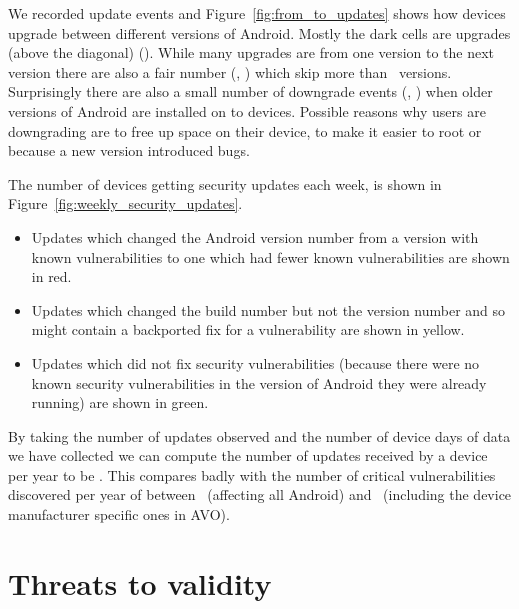\documentclass[conference,a4paper,twoside]{IEEEtran}
\newcommand{\avo}{AVO}
\begin{document}
We recorded update events and Figure~\ref{fig:from_to_updates} shows how devices upgrade between different versions of Android.
Mostly the dark cells are upgrades (above the diagonal) (\daNumUpdatesUpgrades).
While many upgrades are from one version to the next version there are also a fair number (\daNumUpdatesBigUpgrades, \daPercBigUpgrades) which skip more than \daNumUpdatesSkippedBig\ versions.
Surprisingly there are also a small number of downgrade events (\daNumUpdatesDowngrades, \daPercUpdatesDowngrades) when older versions of Android are installed on to devices.
Possible reasons why users are downgrading are to free up space on their device, to make it easier to root or because a new version introduced bugs.

The number of devices getting security updates each week, is shown in Figure~\ref{fig:weekly_security_updates}.
\begin{itemize}
 \item Updates which changed the Android version number from a version with known vulnerabilities to one which had fewer known vulnerabilities are shown in red.
 \item Updates which changed the build number but not the version number and so might contain a backported fix for a vulnerability are shown in yellow.
\item Updates which did not fix security vulnerabilities (because there were no known security vulnerabilities in the version of Android they were already running) are shown in green.

\end{itemize}

By taking the number of updates observed and the number of device days of data we have collected we can compute the number of updates received by a device per year to be \daUpdatesPerYear.
This compares badly with the number of critical vulnerabilities discovered per year of between \avoVulnsPerYearAllAndroid\ (affecting all Android) and \avoVulnsPerYear\ (including the device manufacturer specific ones in \avo).





\section{Threats to validity}
\label{sec:validity}
\end{document}

